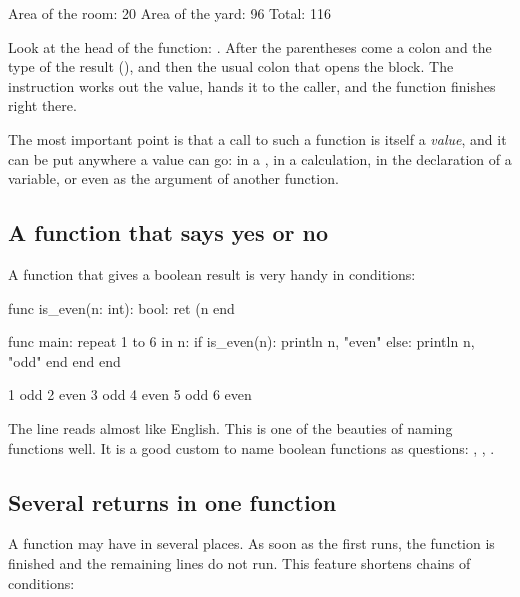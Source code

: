 \begin{salamout}
Area of the room: 20
Area of the yard: 96
Total: 116
\end{salamout}

Look at the head of the function:
. After the
parentheses come a colon and the type of the result (), and then
the usual colon that opens the block. The instruction
 works out the value, hands it to the caller, and
the function finishes right there.

The most important point is that a call to such a function is itself a
\emph{value}, and it can be put anywhere a value can go: in a
, in a calculation, in the declaration of a variable, or even
as the argument of another function.

\subsection{A function that says yes or no}

A function that gives a boolean result is very handy in conditions:

\begin{salamcode}
func is_even(n: int): bool:
    ret (n %
end

func main:
    repeat 1 to 6 in n:
        if is_even(n):
            println n, "even"
        else:
            println n, "odd"
        end
    end
end
\end{salamcode}

\begin{salamout}
1 odd
2 even
3 odd
4 even
5 odd
6 even
\end{salamout}

The line  reads almost like English. This is one of
the beauties of naming functions well. It is a good custom to name boolean
functions as questions: , , .

\subsection{Several returns in one function}

A function may have  in several places. As soon as the first
 runs, the function is finished and the remaining lines do not
run. This feature shortens chains of conditions:

